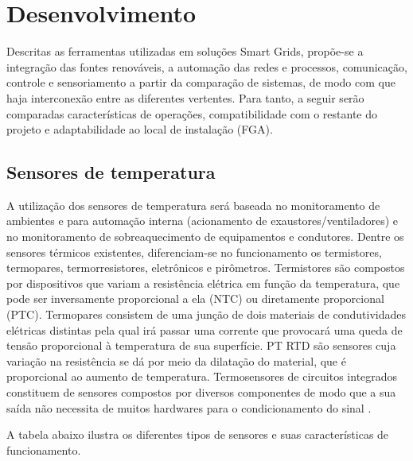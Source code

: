 \section{Desenvolvimento}
Descritas as ferramentas utilizadas em soluções Smart Grids, propõe-se a integração das fontes renováveis, a automação das redes e processos, comunicação, controle e sensoriamento a partir da comparação de sistemas, de modo com que haja interconexão entre as diferentes vertentes. Para tanto, a seguir serão comparadas características de operações, compatibilidade com o restante do projeto e adaptabilidade ao local de instalação (FGA).

\subsection{Sensores de temperatura}
A utilização dos sensores de temperatura será baseada no monitoramento de ambientes e para automação interna (acionamento de exaustores/ventiladores) e no monitoramento de sobreaquecimento de equipamentos e condutores. Dentre os sensores térmicos existentes, diferenciam-se no funcionamento os termistores, termopares, termorresistores, eletrônicos e pirômetros. Termistores são compostos por dispositivos que variam a resistência elétrica em função da temperatura, que pode ser inversamente proporcional a ela (NTC) ou diretamente proporcional (PTC). Termopares consistem de uma junção de dois materiais de condutividades elétricas distintas pela qual irá passar uma corrente que provocará uma queda de tensão proporcional à temperatura de sua superfície. PT RTD são sensores cuja variação na resistência se dá por meio da dilatação do material, que é proporcional ao aumento de temperatura. Termosensores de circuitos integrados constituem de sensores compostos por diversos componentes de modo que a sua saída não necessita de muitos hardwares para o condicionamento do sinal \cite{thomazini2005sensores}.

A tabela abaixo ilustra os diferentes tipos de sensores e suas características de funcionamento.

